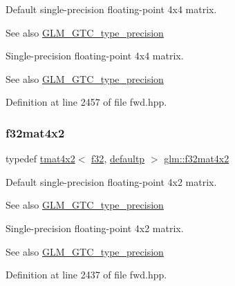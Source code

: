 Default single-\/precision floating-\/point 4x4 matrix. \begin{DoxySeeAlso}{See also}
\mbox{\hyperlink{group__gtc__type__precision}{G\+L\+M\+\_\+\+G\+T\+C\+\_\+type\+\_\+precision}}
\end{DoxySeeAlso}
Single-\/precision floating-\/point 4x4 matrix. \begin{DoxySeeAlso}{See also}
\mbox{\hyperlink{group__gtc__type__precision}{G\+L\+M\+\_\+\+G\+T\+C\+\_\+type\+\_\+precision}} 
\end{DoxySeeAlso}


Definition at line 2457 of file fwd.\+hpp.

\mbox{\label{group__gtc__type__precision_gab531a3d0479121732ae090254e0bd58f}} 
\subsubsection{\texorpdfstring{f32mat4x2}{f32mat4x2}}
{\footnotesize\ttfamily typedef \mbox{\hyperlink{structglm_1_1tmat4x2}{tmat4x2}}$<$ \mbox{\hyperlink{group__gtc__type__precision_ga0ec999b57f5330d9021256e96038df04}{f32}}, \mbox{\hyperlink{namespaceglm_a0f04f086094c747d227af4425893f545a9d21ccd8b5a009ec7eb7677befc3bf51}{defaultp}} $>$ \mbox{\hyperlink{group__gtc__type__precision_gab531a3d0479121732ae090254e0bd58f}{glm\+::f32mat4x2}}}

Default single-\/precision floating-\/point 4x2 matrix. \begin{DoxySeeAlso}{See also}
\mbox{\hyperlink{group__gtc__type__precision}{G\+L\+M\+\_\+\+G\+T\+C\+\_\+type\+\_\+precision}}
\end{DoxySeeAlso}
Single-\/precision floating-\/point 4x2 matrix. \begin{DoxySeeAlso}{See also}
\mbox{\hyperlink{group__gtc__type__precision}{G\+L\+M\+\_\+\+G\+T\+C\+\_\+type\+\_\+precision}} 
\end{DoxySeeAlso}


Definition at line 2437 of file fwd.\+hpp.

\mbox{\label{group__gtc__type__precision_gad68d998fa74028e02bfadd4778bd549a}} 
